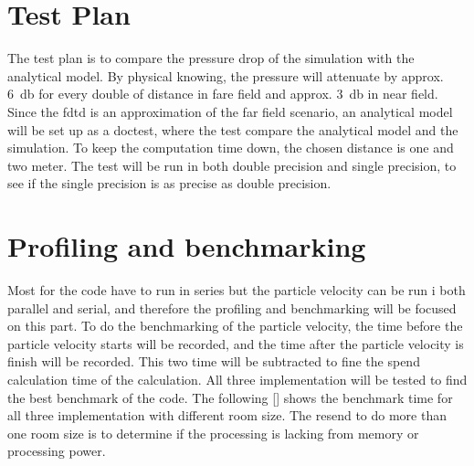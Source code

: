 \section{Test Plan}
The test plan is to compare the pressure drop of the simulation with the analytical model. By physical knowing, the pressure will attenuate by approx. \SI{6}{\decibel} for every double of distance in fare field and approx. \SI{3}{\decibel} in near field. Since the \gls{fdtd} is an approximation of the far field scenario, an analytical model will be set up as a doctest, where the test compare the analytical model and the simulation. To keep the computation time down, the chosen distance is one and two meter. The test will be run in both double precision and single precision, to see if the single precision is as precise as double precision.

\section{Profiling and benchmarking}
Most for the code have to run in series but the particle velocity can be run i both parallel and serial, and therefore the profiling and benchmarking will be focused on this part. To do the benchmarking of the particle velocity, the time before the particle velocity starts will be recorded, and the time after the particle velocity is finish will be recorded. This two time will be subtracted to fine the spend calculation time of the calculation. All three implementation will be tested to find the best benchmark of the code. The following \autoref{} shows the benchmark time for all three implementation with different room size. The resend to do more than one room size is to determine if the processing is lacking from memory or processing power.




